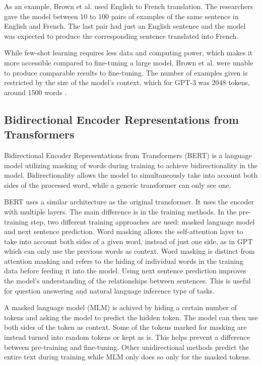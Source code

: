 \documentclass[twoside]{article}
\begin{document}
As an example, Brown et al. \cite{brown_language_2020} used English to French translation.
The researchers gave the model between 10 to 100 pairs of examples of the
same sentence in English and French. The last pair had just an English sentence
and the model was expected to produce the corresponding sentence translated into
French.

While few-shot learning requires less data and computing power, which makes it more
accessible compared to fine-tuning a large model, Brown et al. \cite{brown_language_2020} 
were unable to produce comparable results to fine-tuning.
The number of examples given is restricted by the size of the model's context,
which for GPT-3 was 2048 tokens, around 1500 words \cite{noauthor_pricing_nodate}.

\subsection{Bidirectional Encoder Representations from Transformers}
Bidirectional Encoder Representations from Transformers (BERT)
is a language model utilizing masking of words during training to achieve bidirectionality
in the model. Bidirectionality allows the model to simultaneously take into account
both sides of the processed word, while a generic transformer can only see one. \cite{devlin_bert_2019}

BERT uses a similar architecture as the original transformer. It uses the encoder with
multiple layers. The main difference is in the training methods. In the pre-training step,
two different training approaches are used: masked language model and next sentence prediction.
Word masking allows the self-attention layer to take into account both sides of a given word, instead
of just one side, as in GPT which can only use the previous words as context. Word masking is
distinct from attention masking and refers to the hiding of individual words in the training data
before feeding it into the model.
 Using next sentence
prediction improves the model's understanding of the relationships between sentences. This is
useful for question answering and natural language inference type of tasks. \cite{devlin_bert_2019}

A masked language model (MLM) is achived by hiding a certain number of tokens and
asking the model to predict the hidden token. The model can then use both sides of the token as
context. Some of the tokens marked for masking are instead turned 
into random tokens or kept as is. This helps prevent a difference between pre-training and fine-tuning.
Other unidirectional methods predict the entire text during training while MLM only 
does so only for the masked tokens. \cite{devlin_bert_2019}
\end{document}
